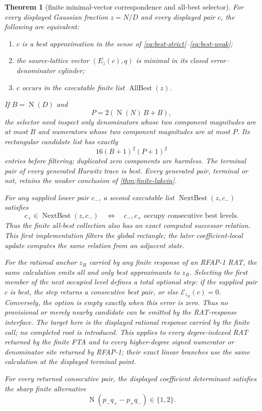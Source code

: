 \documentclass[11pt]{article}
\newtheorem{theorem}{Theorem}[section]
\newcommand{\Norm}[1]{\operatorname{N}\!\left(#1\right)}
\begin{document}
\begin{theorem}[finite minimal-vector correspondence and all-best selector]
\label{thm:finite-all-best}
For every displayed Gaussian fraction $z=N/D$ and every displayed pair $c$,
the following are equivalent:
\begin{enumerate}
\item $c$ is a best approximation in the sense of
      \eqref{eq:best-strict}--\eqref{eq:best-weak};
\item the source-lattice vector $(E_z(c),q)$ is minimal in its closed
      error--denominator cylinder;
\item $c$ occurs in the executable finite list $\operatorname{AllBest}(z)$.
\end{enumerate}
If $B=\Norm D$ and
\[
                    P=2(\Norm N\,B+B),
\]
the selector need inspect only denominators whose two component magnitudes
are at most $B$ and numerators whose two component magnitudes are at most
$P$.  Its rectangular candidate list has exactly
\[
                         16(B+1)^2(P+1)^2
\]
entries before filtering; duplicated zero components are harmless.  The
terminal pair of every generated Hurwitz trace is best.  Every generated
pair, terminal or not, retains the weaker conclusion of
\cref{thm:finite-lakein}.

For any supplied lower pair $c_-$, a second executable list
$\operatorname{NextBest}(z,c_-)$ satisfies
\begin{equation}
\label{eq:next-best-membership}
 c_+\in\operatorname{NextBest}(z,c_-)
 \quad\Longleftrightarrow\quad
 c_-,c_+\text{ occupy consecutive best levels}.
\end{equation}
Thus the finite all-best collection also has an exact computed successor
relation.  This first implementation filters the global rectangle; the later
coefficient-local update computes the same relation from an adjacent state.

For the rational anchor $z_R$ carried by any finite response of an RFAP-1 RAT,
the same calculation emits all and only best approximants to $z_R$.
Selecting the first member of the next occupied level defines a total optional
step: if the supplied pair $c$ is best, the step returns a consecutive best
pair, or else $\mathcal E_{z_R}(c)=0$.  Conversely, the option is empty exactly
when this error is zero.  Thus no provisional or merely nearby candidate can
be emitted by the RAT-response interface.  The target here is the displayed
rational response carried by the finite call; no completed root is introduced.
This applies to every degree-indexed RAT returned by the finite FTA and to
every higher-degree signed numerator or denominator site returned by RFAP-1;
their exact linear branches use the same calculation at the displayed
terminal point.

For every returned consecutive pair, the displayed coefficient determinant
satisfies the sharp finite alternative
\[
       \Norm{p_-q_+-p_+q_-}\in\{1,2\}.
\]
\end{theorem}
\end{document}
